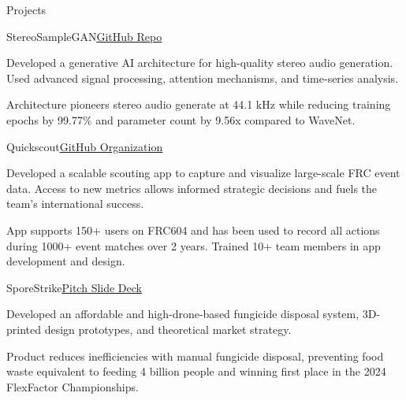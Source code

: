 \documentclass[
  11pt, %
]{resume}
\begin{document}
\begin{rSection}{Projects}

  
  \begin{rSubsection}{StereoSampleGAN}{}{\underline{\href{https://github.com/shuklabhay/stereo-sample-gan}{GitHub Repo}}}{}
       
    \item Developed a generative AI architecture for high-quality stereo audio generation. Used advanced signal processing, attention mechanisms, and time-series analysis.
        
    \item Architecture pioneers stereo audio generate at 44.1 kHz while reducing training epochs by 99.77\% and parameter count by 9.56x compared to WaveNet.
        
  \end{rSubsection}
      
  \begin{rSubsection}{Quickscout}{}{\underline{\href{https://github.com/frc604}{GitHub Organization}}}{}
       
    \item Developed a scalable scouting app to capture and visualize large-scale FRC event data. Access to new metrics allows informed strategic decisions and fuels the team's international success.
        
    \item App supports 150+ users on FRC604 and has been used to record all actions during 1000+ event matches over 2 years. Trained 10+ team members in app development and design.
        
  \end{rSubsection}
      
  \begin{rSubsection}{SporeStrike}{}{\underline{\href{https://shuklabhay.github.io/static/projects/sporestrike/FlexFactor_SporeStrike_pitch.pdf}{Pitch Slide Deck}}}{}
       
    \item Developed an affordable and high-drone-based fungicide disposal system, 3D-printed design prototypes, and theoretical market strategy.
        
    \item Product reduces inefficiencies with manual fungicide disposal, preventing food waste equivalent to feeding 4 billion people and winning first place in the 2024 FlexFactor Championships.
        
  \end{rSubsection}
      
	
\end{rSection}
    
\end{document}
